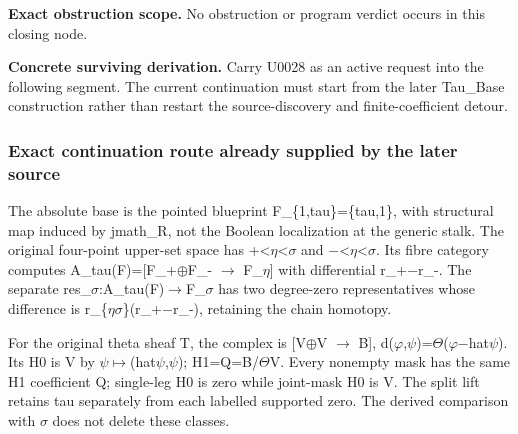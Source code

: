 \textbf{Exact obstruction scope.} No obstruction or program verdict
occurs in this closing node.

\textbf{Concrete surviving derivation.} Carry U0028 as an active request
into the following segment. The current continuation must start from the
later Tau\_Base construction rather than restart the source-discovery
and finite-coefficient detour.

\subsubsection{Exact continuation route already supplied by the later
source}\label{exact-continuation-route-already-supplied-by-the-later-source}

The absolute base is the pointed blueprint F\_\{1,tau\}=\{tau,1\}, with
structural map induced by jmath\_R, not the Boolean localization at the
generic stalk. The original four-point upper-set space has
+<\allowbreak{}\ensuremath{η}\allowbreak{}<\allowbreak{}\ensuremath{σ}\allowbreak{}
and
\allowbreak{}\ensuremath{−}\allowbreak{}<\allowbreak{}\ensuremath{η}\allowbreak{}<\allowbreak{}\ensuremath{σ}\allowbreak{}.
Its fibre category computes
A\_tau(F)=[F\_+\allowbreak{}\ensuremath{⊕}\allowbreak{}F\_-
\allowbreak{}\ensuremath{→}\allowbreak{}
F\_\allowbreak{}\ensuremath{η}\allowbreak{}] with differential
r\_+\allowbreak{}\ensuremath{−}\allowbreak{}r\_-. The separate
res\_\allowbreak{}\ensuremath{σ}\allowbreak{}:A\_tau(F)\allowbreak{}\ensuremath{→}\allowbreak{}F\_\allowbreak{}\ensuremath{σ}\allowbreak{}
has two degree-zero representatives whose difference is
r\_\{\allowbreak{}\ensuremath{η}\allowbreak{}\allowbreak{}\ensuremath{σ}\allowbreak{}\}(r\_+\allowbreak{}\ensuremath{−}\allowbreak{}r\_-),
retaining the chain homotopy.

For the original theta sheaf T, the complex is
[V\allowbreak{}\ensuremath{⊕}\allowbreak{}V
\allowbreak{}\ensuremath{→}\allowbreak{} B{]},
d(\allowbreak{}\ensuremath{φ}\allowbreak{},\allowbreak{}\ensuremath{ψ}\allowbreak{})=\allowbreak{}\ensuremath{Θ}\allowbreak{}(\allowbreak{}\ensuremath{φ}\allowbreak{}\allowbreak{}\ensuremath{−}\allowbreak{}hat\allowbreak{}\ensuremath{ψ}\allowbreak{}).
Its H0 is V by
\allowbreak{}\ensuremath{ψ}\allowbreak{}\allowbreak{}\ensuremath{↦}\allowbreak{}(hat\allowbreak{}\ensuremath{ψ}\allowbreak{},\allowbreak{}\ensuremath{ψ}\allowbreak{});
H1=Q=B/\allowbreak{}\ensuremath{Θ}\allowbreak{}V. Every nonempty mask
has the same H1 coefficient Q; single-leg H0 is zero while joint-mask H0
is V. The split lift retains tau separately from each labelled supported
zero. The derived comparison with
\allowbreak{}\ensuremath{σ}\allowbreak{} does not delete these classes.

